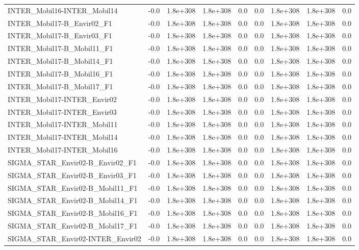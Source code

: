 \begin{tabular}{lrrrrrrrr}
INTER_Mobil16-INTER_Mobil14 & -0.0 & 1.8e+308 & 1.8e+308 & 0.0 & 0.0 & 1.8e+308 & 1.8e+308 & 0.0 \\
INTER_Mobil17-B_Envir02_F1 & -0.0 & 1.8e+308 & 1.8e+308 & 0.0 & 0.0 & 1.8e+308 & 1.8e+308 & 0.0 \\
INTER_Mobil17-B_Envir03_F1 & -0.0 & 1.8e+308 & 1.8e+308 & 0.0 & 0.0 & 1.8e+308 & 1.8e+308 & 0.0 \\
INTER_Mobil17-B_Mobil11_F1 & -0.0 & 1.8e+308 & 1.8e+308 & 0.0 & 0.0 & 1.8e+308 & 1.8e+308 & 0.0 \\
INTER_Mobil17-B_Mobil14_F1 & -0.0 & 1.8e+308 & 1.8e+308 & 0.0 & 0.0 & 1.8e+308 & 1.8e+308 & 0.0 \\
INTER_Mobil17-B_Mobil16_F1 & -0.0 & 1.8e+308 & 1.8e+308 & 0.0 & 0.0 & 1.8e+308 & 1.8e+308 & 0.0 \\
INTER_Mobil17-B_Mobil17_F1 & -0.0 & 1.8e+308 & 1.8e+308 & 0.0 & 0.0 & 1.8e+308 & 1.8e+308 & 0.0 \\
INTER_Mobil17-INTER_Envir02 & -0.0 & 1.8e+308 & 1.8e+308 & 0.0 & 0.0 & 1.8e+308 & 1.8e+308 & 0.0 \\
INTER_Mobil17-INTER_Envir03 & -0.0 & 1.8e+308 & 1.8e+308 & 0.0 & 0.0 & 1.8e+308 & 1.8e+308 & 0.0 \\
INTER_Mobil17-INTER_Mobil11 & -0.0 & 1.8e+308 & 1.8e+308 & 0.0 & 0.0 & 1.8e+308 & 1.8e+308 & 0.0 \\
INTER_Mobil17-INTER_Mobil14 & -0.0 & 1.8e+308 & 1.8e+308 & 0.0 & 0.0 & 1.8e+308 & 1.8e+308 & 0.0 \\
INTER_Mobil17-INTER_Mobil16 & -0.0 & 1.8e+308 & 1.8e+308 & 0.0 & 0.0 & 1.8e+308 & 1.8e+308 & 0.0 \\
SIGMA_STAR_Envir02-B_Envir02_F1 & -0.0 & 1.8e+308 & 1.8e+308 & 0.0 & 0.0 & 1.8e+308 & 1.8e+308 & 0.0 \\
SIGMA_STAR_Envir02-B_Envir03_F1 & -0.0 & 1.8e+308 & 1.8e+308 & 0.0 & 0.0 & 1.8e+308 & 1.8e+308 & 0.0 \\
SIGMA_STAR_Envir02-B_Mobil11_F1 & -0.0 & 1.8e+308 & 1.8e+308 & 0.0 & 0.0 & 1.8e+308 & 1.8e+308 & 0.0 \\
SIGMA_STAR_Envir02-B_Mobil14_F1 & -0.0 & 1.8e+308 & 1.8e+308 & 0.0 & 0.0 & 1.8e+308 & 1.8e+308 & 0.0 \\
SIGMA_STAR_Envir02-B_Mobil16_F1 & -0.0 & 1.8e+308 & 1.8e+308 & 0.0 & 0.0 & 1.8e+308 & 1.8e+308 & 0.0 \\
SIGMA_STAR_Envir02-B_Mobil17_F1 & -0.0 & 1.8e+308 & 1.8e+308 & 0.0 & 0.0 & 1.8e+308 & 1.8e+308 & 0.0 \\
SIGMA_STAR_Envir02-INTER_Envir02 & -0.0 & 1.8e+308 & 1.8e+308 & 0.0 & 0.0 & 1.8e+308 & 1.8e+308 & 0.0 \\

\end{tabular}
